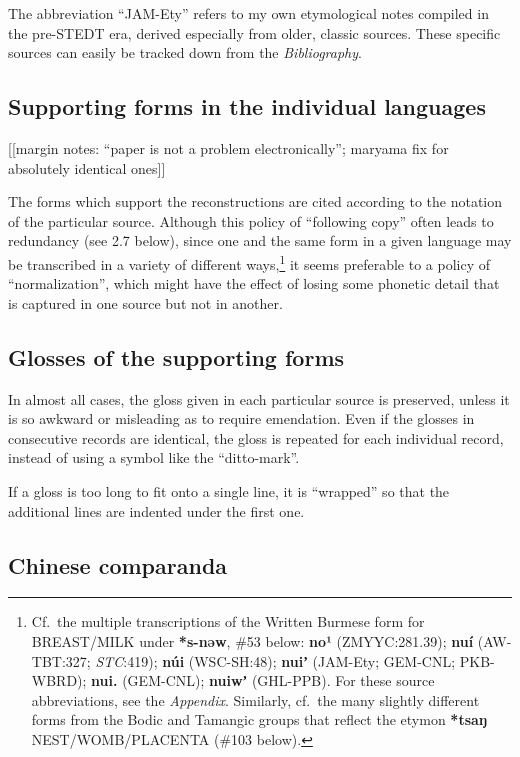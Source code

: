The abbreviation “JAM-Ety” refers to my own etymological notes compiled in the
pre-STEDT era, derived especially from older, classic sources.  These specific
sources can easily be tracked down from the \textit{Bibliography}.

\subsection{Supporting forms in the individual languages}

[[margin notes: ``paper is not a problem electronically''; maryama fix for absolutely identical ones]]

The forms which support the reconstructions are cited according to the
notation of the particular source.  Although this policy of “following copy”
often leads to redundancy (see 2.7 below), since one and the same form in a
given language may be transcribed in a variety of different ways,\footnote{Cf.\ the
multiple transcriptions of the Written Burmese form for BREAST/MILK under
\textbf{*s-nəw}, \#53 below:  \textbf{no¹}
(ZMYYC:281.39); \textbf{nuí} (AW-TBT:327; \textit{STC}:419); \textbf{núi}
(WSC-SH:48); \textbf{nuiʼ} (JAM-Ety; GEM-CNL; PKB-WBRD);
\textbf{nui.} (GEM-CNL); \textbf{nuiwʼ} (GHL-PPB).
 For these source abbreviations, see the \textit{Appendix}. Similarly, cf.\ the many slightly different forms from the Bodic and Tamangic groups that reflect the etymon \textbf{*tsaŋ} NEST/WOMB/PLACENTA (\#103 below).} it seems preferable to a
policy of “normalization”, which might have the effect of losing some phonetic
detail that is captured in one source but not in another.

\subsection{Glosses of the supporting forms}


In almost all cases, the gloss given in each particular source is preserved,
unless it is so awkward or misleading as to require emendation.  Even if the
glosses in consecutive records are identical, the gloss is repeated for each
individual record, instead of using a symbol like the “ditto-mark”.  


If a gloss is too long to fit onto a single line, it is “wrapped” so that
the additional lines are indented under the first one.


\subsection{Chinese comparanda}

